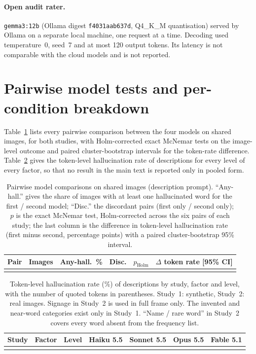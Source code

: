 \begin{appendices}
\paragraph{Open audit rater.} \texttt{gemma3:12b} (Ollama digest \texttt{f4031aab637d}, Q4\_K\_M quantisation) served by Ollama \OllamaVersion{} on a separate local machine, one request at a time. Decoding used temperature~0, seed~7 and at most 120 output tokens. Its latency is not comparable with the cloud models and is not reported.

\section{Pairwise model tests and per-condition breakdown}\label{secA2}

Table~\ref{tab:pairs} lists every pairwise comparison between the four models on shared images, for both studies, with Holm-corrected exact McNemar tests on the image-level outcome and paired cluster-bootstrap intervals for the token-rate difference. Table~\ref{tab:breakdown} gives the token-level hallucination rate of descriptions for every level of every factor, so that no result in the main text is reported only in pooled form.

\begin{table}[!tbp]
\caption{Pairwise model comparisons on shared images (description prompt). ``Any-hall.'' gives the share of images with at least one hallucinated word for the first / second model; ``Disc.'' the discordant pairs (first only / second only); $p$ is the exact McNemar test, Holm-corrected across the six pairs of each study; the last column is the difference in token-level hallucination rate (first minus second, percentage points) with a paired cluster-bootstrap 95\% interval.}\label{tab:pairs}
\footnotesize
\setlength{\tabcolsep}{3pt}
\begin{tabular*}{\textwidth}{@{\extracolsep\fill}lrrrrl}
\toprule
Pair & Images & Any-hall.\ \% & Disc. & $p_\mathrm{Holm}$ & $\Delta$ token rate [95\% CI] \\
\midrule
\botrule
\end{tabular*}
\end{table}


\begin{table}[!tbp]
\caption{Token-level hallucination rate (\%) of descriptions by study, factor and level, with the number of quoted tokens in parentheses. Study~1: synthetic, Study~2: real images. Signage in Study~2 is used in full frame only. The invented and near-word categories exist only in Study~1. ``Name / rare word'' in Study~2 covers every word absent from the frequency list.}\label{tab:breakdown}
\footnotesize
\setlength{\tabcolsep}{3pt}
\begin{tabular*}{\textwidth}{@{\extracolsep\fill}lllrrrr}
\toprule
Study & Factor & Level & Haiku 5.5 & Sonnet 5.5 & Opus 5.5 & Fable 5.1 \\
\midrule
\botrule
\end{tabular*}
\end{table}

\FloatBarrier
\end{appendices}
